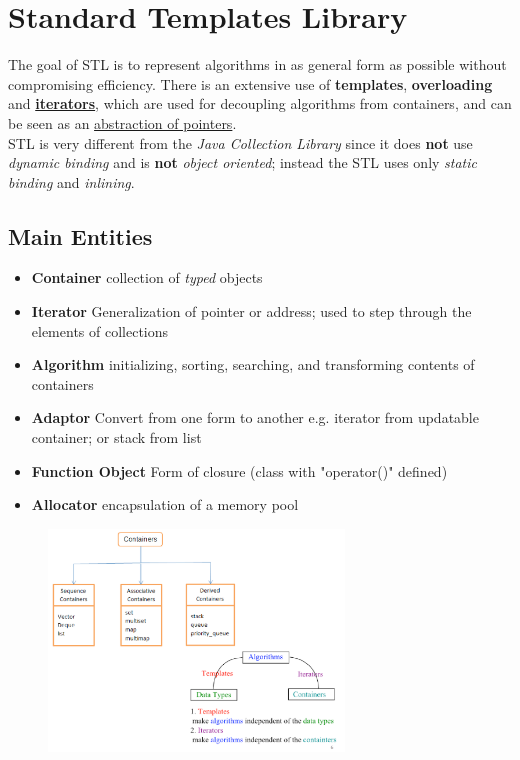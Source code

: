 \chapter{Standard Templates Library}
The goal of STL is to represent algorithms in as general form as possible without compromising efficiency.
There is an extensive use of \textbf{templates}, \textbf{overloading} and \ul{\textbf{iterators}},
which are used for decoupling algorithms from containers,
and can be seen as an \ul{abstraction of pointers}.\\
STL is very different from the \textit{Java Collection Library} since it does \textbf{not} use \textit{dynamic binding} and is \textbf{not} \textit{object oriented};
instead the STL uses only \textit{static binding} and \textit{inlining}.

\section{Main Entities}
\begin{itemize}
   \item \textbf{Container} collection of \textit{typed} objects
   \item \textbf{Iterator} Generalization of pointer or address;
   used to step through the elements of collections
   \item \textbf{Algorithm} initializing, sorting, searching, and transforming contents of containers
   \item \textbf{Adaptor} Convert from one form to another e.g. iterator from updatable container; or stack from list
   \item \textbf{Function Object} Form of closure (class with "operator()" defined)
   \item \textbf{Allocator} encapsulation of a memory pool
\end{itemize}

\begin{figure}[h]
   \centering
   \includegraphics[width=0.7\textwidth]{images/STL_containers.png}
   \label{fig:STL_containers}
\end{figure}

